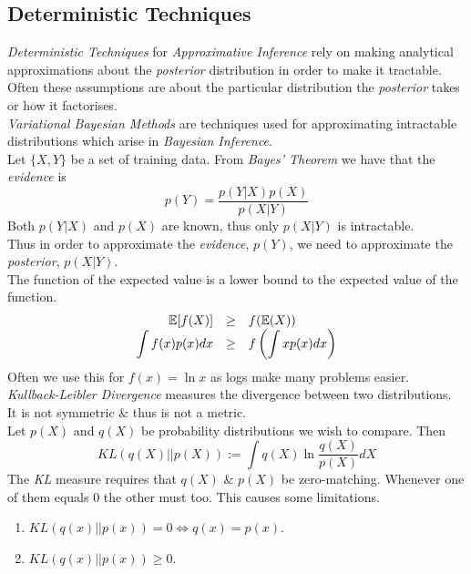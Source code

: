 \documentclass[11pt,a4paper]{article}
\begin{document}
\subsection{Deterministic Techniques}

\textit{Deterministic Techniques} for \textit{Approximative Inference} rely on making analytical approximations about the \textit{posterior} distribution in order to make it tractable.\\
Often these assumptions are about the particular distribution the \textit{posterior} takes or how it factorises.\\

\textit{Variational Bayesian Methods} are techniques used for approximating intractable distributions which arise in \textit{Bayesian Inference}.\\
Let $\{X,Y\}$ be a set of training data. From \textit{Bayes' Theorem} we have that the \textit{evidence} is
$$p(Y)=\frac{p(Y|X)p(X)}{p(X|Y)}$$
Both $p(Y|X)$ and $p(X)$ are known, thus only $p(X|Y)$ is intractable.\\
Thus in order to approximate the \textit{evidence}, $p(Y)$, we need to approximate the \textit{posterior}, $p(X|Y)$.\\

The function of the expected value is a lower bound to the expected value of the function.
\[\begin{array}{rcl}
\mathbb{E}[f(X)]&\geq&f(\mathbb{E}(X))\\
\displaystyle\int f(x)p(x)dx&\geq&f\left(\displaystyle\int xp(x)dx\right)
\end{array}\]
\nb Often we use this for $f(x)=\ln x$ as logs make many problems easier.\\

\textit{Kullback-Leibler Divergence} measures the divergence between two distributions.\\
It is not symmetric \& thus is not a metric.\\
Let $p(X)$ and $q(X)$ be probability distributions we wish to compare. Then
$$KL(q(X)||p(X)):=\int q(X)\ln\dfrac{q(X)}{p(X)}dX$$
\nb The \textit{KL} measure requires that $q(X)$ \& $p(X)$ be zero-matching. \ie Whenever one of them equals 0 the other must too. This causes some limitations.\\

\begin{enumerate}
	\item $KL(q(x)||p(x))=0\Longleftrightarrow q(x)=p(x)$.
	\item $KL(q(x)||p(x))\geq0$.
\end{enumerate}
\end{document}
